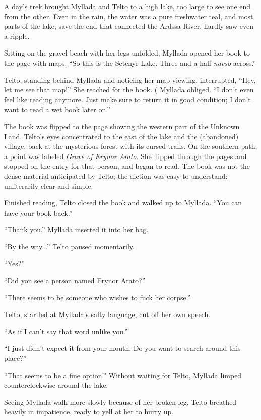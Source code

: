 \centeredstars

A day's trek brought Myllada and Telto to a high lake, too large to see one end from the other. Even in the rain, the water was a pure freshwater teal, and most parts of the lake, save the end that connected the Ardssa River, hardly saw even a ripple.

Sitting on the gravel beach with her legs unfolded, Myllada opened her book to the page with maps. ``So this is the Setenyr Lake. Three and a half \emph{navso} across.''

Telto, standing behind Myllada and noticing her map-viewing, interrupted, ``Hey, let me see that map!'' She reached for the book.
(
Myllada obliged. ``I don't even feel like reading anymore. Just make sure to return it in good condition; I don't want to read a wet book later on.''

The book was flipped to the page showing the western part of the Unknown Land. Telto's eyes concentrated to the east of the lake and the (abandoned) village, back at the mysterious forest with its cursed trails. On the southern path, a point was labeled \emph{Grave of Erynor Arato}. She flipped through the pages and stopped on the entry for that person, and began to read. The book was not the dense material anticipated by Telto; the diction was easy to understand; unliterarily clear and simple.

Finished reading, Telto closed the book and walked up to Myllada. ``You can have your book back.''

``Thank you.'' Myllada inserted it into her bag.

``By the way...'' Telto paused momentarily.

``Yes?''

``Did you see a person named Erynor Arato?''

``There seems to be someone who wishes to fuck her corpse.''

Telto, startled at Myllada's salty language, cut off her own speech.

``As if I can't say that word unlike you.''

``I just didn't expect it from your mouth. Do you want to search around this place?''

``That seems to be a fine option.'' Without waiting for Telto, Myllada limped counterclockwise around the lake.

\centeredstars

Seeing Myllada walk more slowly because of her broken leg, Telto breathed heavily in impatience, ready to yell at her to hurry up.

